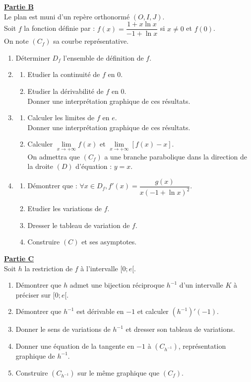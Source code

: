 \documentclass[12pt,a4paper]{article}
\newcounter{probleme}                                     %
\renewcommand{\theprobleme}{\arabic{probleme}}           %
\newcommand{\exo}{\refstepcounter{probleme}\textbf{Problème \theprobleme}\ } %
\begin{document}
\noindent \underline{\textbf{Partie B}} \\
Le plan est muni d'un repère orthonormé $(O, I, J)$. \\
Soit $f$ la fonction définie par : $f(x) = \dfrac{1 + x\ln x}{-1 + \ln x}$ si $x \neq 0$ et $f(0)$. \\
On note $(C_f)$ sa courbe représentative.
\begin{enumerate}
    \item Déterminer $D_f$ l'ensemble de définition de $f$.
    \item \begin{enumerate}
        \item Etudier la continuité de $f$ en $0$.
        \item Etudier la dérivabilité de $f$ en $0$. \\
        Donner une interprétation graphique de ces résultats.
    \end{enumerate}
    \item \begin{enumerate}
        \item Calculer les limites de $f$ en $e$. \\
        Donner une interprétation graphique de ces résultats.
        \item Calculer $\lim\limits_{x \to +\infty} f(x)$ et $\lim\limits_{x \to +\infty} [f(x) - x]$. \\
        On admettra que $(C_f)$ a une branche parabolique dans la direction de la droite $(D)$ d'équation : $y = x$.
    \end{enumerate}
    \item \begin{enumerate}
        \item Démontrer que : $\forall x \in D_f, f'(x) = \dfrac{g(x)}{x(-1 + \ln x)^2}$.
        \item Etudier les variations de $f$.
        \item Dresser le tableau de variation de $f$.
        \item Construire $(C)$ et ses asymptotes.
    \end{enumerate}
\end{enumerate}

\vspace{0.5cm}

\noindent \underline{\textbf{Partie C}} \\
Soit $h$ la restriction de $f$ à l'intervalle $[0; e[$.
\begin{enumerate}
    \item Démontrer que $h$ admet une bijection réciproque $h^{-1}$ d'un intervalle $K$ à préciser sur $[0; e[$.
    \item Démontrer que $h^{-1}$ est dérivable en $-1$ et calculer $(h^{-1})'(-1)$.
    \item Donner le sens de variations de $h^{-1}$ et dresser son tableau de variations.
    \item Donner une équation de la tangente en $-1$ à $(C_{h^{-1}})$, représentation graphique de $h^{-1}$.
    \item Construire $(C_{h^{-1}})$ sur le même graphique que $(C_f)$.
\end{enumerate}

\end{document}
